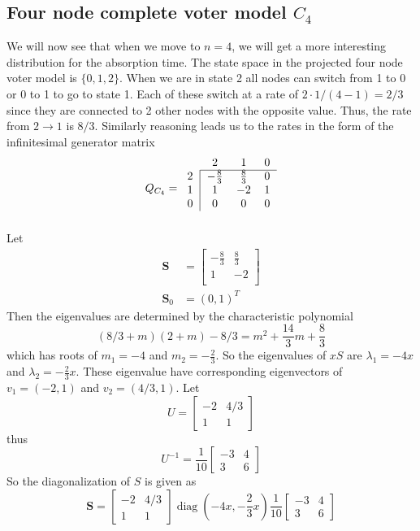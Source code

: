 \subsection{Four node complete voter model \texorpdfstring{$C_4$}{VC4}}
We will now see that when we move to $n = 4$, we will get a more interesting distribution for the absorption time.
The state space in the projected four node voter model is $\{0,1,2\}$.
When we are in state 2 all nodes can switch from 1 to 0 or 0 to 1 to go to state 1.
Each of these switch at a rate of $2 \cdot 1/(4 - 1) = 2/3$ since they are connected to 2 other nodes with the opposite value.
Thus, the rate from $2 \to 1$ is $8/3$.
Similarly reasoning leads us to the rates in the form of the infinitesimal generator matrix
$$
Q_{C_4} = \begin{blockarray}{cccc}
    & 2 & 1 & 0\\
    \begin{block}{c|ccc}
        \cline{2-4}
        2 & -\frac{8}{3} & \frac{8}{3} & 0 \\
        1 & 1 & -2 & 1\\
        0 & 0 & 0 & 0\\
    \end{block}
\end{blockarray}
$$
Let
\begin{align*}
    \mathbf{S} &= \begin{bmatrix}
    -\frac{8}{3} & \frac{8}{3}\\
    1 & -2\\
    \end{bmatrix}\\
    \mathbf{S}_0 &= (0, 1)^T
\end{align*}
Then the eigenvalues are determined by the characteristic polynomial
$$
(8/3 + m)(2 + m) - 8/3 = m^2 + \frac{14}{3} m + \frac{8}{3}
$$
which has roots of $m_1 = -4$ and $m_2 = - \frac{2}{3}$.
So the eigenvalues of $xS$ are $\lambda_1 = -4x$ and $\lambda_2 =  - \frac{2}{3} x$.
These eigenvalue have corresponding eigenvectors of $v_1 = (-2, 1)$ and $v_2 = (4/3, 1)$.
Let
$$
U = \begin{bmatrix}
    -2 & 4/3\\
    1 & 1
\end{bmatrix}
$$
thus
$$
U^{-1} = \frac{1}{10} \begin{bmatrix}
    -3 & 4\\
    3 & 6
\end{bmatrix}
$$
So the diagonalization of $S$ is given as
$$
\mathbf{S} = \begin{bmatrix}
    -2 & 4/3\\
    1 & 1
\end{bmatrix} \operatorname{diag}(-4x, - \frac{2}{3} x)
\frac{1}{10} \begin{bmatrix}
    -3 & 4\\
    3 & 6
\end{bmatrix}
$$
